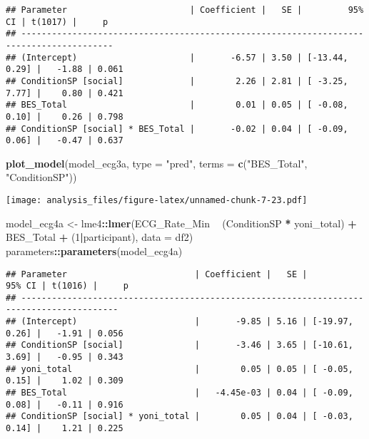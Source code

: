 \documentclass[
]{article}
\newenvironment{Shaded}{\begin{snugshade}}{\end{snugshade}}
\newcommand{\DataTypeTok}[1]{\textcolor[rgb]{0.13,0.29,0.53}{#1}}
\newcommand{\DecValTok}[1]{\textcolor[rgb]{0.00,0.00,0.81}{#1}}
\newcommand{\KeywordTok}[1]{\textcolor[rgb]{0.13,0.29,0.53}{\textbf{#1}}}
\newcommand{\NormalTok}[1]{#1}
\newcommand{\OperatorTok}[1]{\textcolor[rgb]{0.81,0.36,0.00}{\textbf{#1}}}
\newcommand{\StringTok}[1]{\textcolor[rgb]{0.31,0.60,0.02}{#1}}
\begin{document}
\begin{verbatim}
## Parameter                        | Coefficient |   SE |         95% CI | t(1017) |     p
## ----------------------------------------------------------------------------------------
## (Intercept)                      |       -6.57 | 3.50 | [-13.44, 0.29] |   -1.88 | 0.061
## ConditionSP [social]             |        2.26 | 2.81 | [ -3.25, 7.77] |    0.80 | 0.421
## BES_Total                        |        0.01 | 0.05 | [ -0.08, 0.10] |    0.26 | 0.798
## ConditionSP [social] * BES_Total |       -0.02 | 0.04 | [ -0.09, 0.06] |   -0.47 | 0.637
\end{verbatim}

\begin{Shaded}
\begin{Highlighting}[]
\KeywordTok{plot_model}\NormalTok{(model_ecg3a, }\DataTypeTok{type =} \StringTok{"pred"}\NormalTok{, }\DataTypeTok{terms =} \KeywordTok{c}\NormalTok{(}\StringTok{"BES_Total"}\NormalTok{, }\StringTok{"ConditionSP"}\NormalTok{))}
\end{Highlighting}
\end{Shaded}

\texttt{[image: analysis\_files/figure-latex/unnamed-chunk-7-23.pdf]}

\begin{Shaded}
\begin{Highlighting}[]
\NormalTok{model_ecg4a <-}\StringTok{ }\NormalTok{lme4}\OperatorTok{::}\KeywordTok{lmer}\NormalTok{(ECG_Rate_Min }\OperatorTok{~}\StringTok{ }\NormalTok{(ConditionSP }\OperatorTok{*}\StringTok{ }\NormalTok{yoni_total) }\OperatorTok{+}\StringTok{ }\NormalTok{BES_Total }\OperatorTok{+}\StringTok{ }\NormalTok{(}\DecValTok{1}\OperatorTok{|}\NormalTok{participant), }\DataTypeTok{data =}\NormalTok{ df2)}
\NormalTok{parameters}\OperatorTok{::}\KeywordTok{parameters}\NormalTok{(model_ecg4a)}
\end{Highlighting}
\end{Shaded}

\begin{verbatim}
## Parameter                         | Coefficient |   SE |         95% CI | t(1016) |     p
## -----------------------------------------------------------------------------------------
## (Intercept)                       |       -9.85 | 5.16 | [-19.97, 0.26] |   -1.91 | 0.056
## ConditionSP [social]              |       -3.46 | 3.65 | [-10.61, 3.69] |   -0.95 | 0.343
## yoni_total                        |        0.05 | 0.05 | [ -0.05, 0.15] |    1.02 | 0.309
## BES_Total                         |   -4.45e-03 | 0.04 | [ -0.09, 0.08] |   -0.11 | 0.916
## ConditionSP [social] * yoni_total |        0.05 | 0.04 | [ -0.03, 0.14] |    1.21 | 0.225
\end{verbatim}
\end{document}
